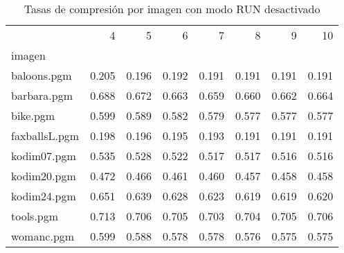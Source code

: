 \begin{table}[h!]
\centering
\caption{Tasas de compresión por imagen con modo RUN desactivado}
\label{tab:norun}
\begin{tabular}{lrrrrrrr}
 & 4 & 5 & 6 & 7 & 8 & 9 & 10 \\
imagen &  &  &  &  &  &  &  \\
baloons.pgm & 0.205 & 0.196 & 0.192 & 0.191 & 0.191 & 0.191 & 0.191 \\
barbara.pgm & 0.688 & 0.672 & 0.663 & 0.659 & 0.660 & 0.662 & 0.664 \\
bike.pgm & 0.599 & 0.589 & 0.582 & 0.579 & 0.577 & 0.577 & 0.577 \\
faxballsL.pgm & 0.198 & 0.196 & 0.195 & 0.193 & 0.191 & 0.191 & 0.191 \\
kodim07.pgm & 0.535 & 0.528 & 0.522 & 0.517 & 0.517 & 0.516 & 0.516 \\
kodim20.pgm & 0.472 & 0.466 & 0.461 & 0.460 & 0.457 & 0.458 & 0.458 \\
kodim24.pgm & 0.651 & 0.639 & 0.628 & 0.623 & 0.619 & 0.619 & 0.620 \\
tools.pgm & 0.713 & 0.706 & 0.705 & 0.703 & 0.704 & 0.705 & 0.706 \\
womanc.pgm & 0.599 & 0.588 & 0.578 & 0.578 & 0.576 & 0.575 & 0.575 \\
\end{tabular}
\end{table}
